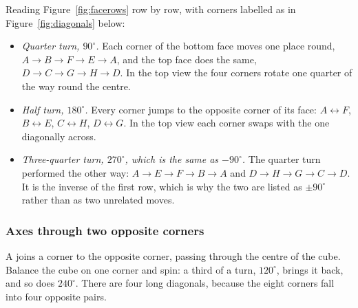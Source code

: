 

Reading Figure~\ref{fig:facerows} row by row, with corners labelled as in
Figure~\ref{fig:diagonals} below:
\begin{itemize}[nosep,leftmargin=1.3em]
\item \emph{Quarter turn, $90^\circ$.} Each corner of the bottom face moves one place round,
$A\to B\to F\to E\to A$, and the top face does the same, $D\to C\to G\to H\to D$. In the top view
the four corners rotate one quarter of the way round the centre.
\item \emph{Half turn, $180^\circ$.} Every corner jumps to the opposite corner of its face:
$A\leftrightarrow F$, $B\leftrightarrow E$, $C\leftrightarrow H$, $D\leftrightarrow G$. In the top
view each corner swaps with the one diagonally across.
\item \emph{Three-quarter turn, $270^\circ$, which is the same as $-90^\circ$.} The quarter turn
performed the other way: $A\to E\to F\to B\to A$ and $D\to H\to G\to C\to D$. It is the inverse of
the first row, which is why the two are listed as $\pm90^\circ$ rather than as two unrelated moves.
\end{itemize}

\subsubsection{Axes through two opposite corners}

A  joins a corner to the opposite corner, passing through the centre of the
cube. Balance the cube on one corner and spin: a third of a turn, $120^\circ$, brings it back, and
so does $240^\circ$. There are four long diagonals, because the eight corners fall into four
opposite pairs.


